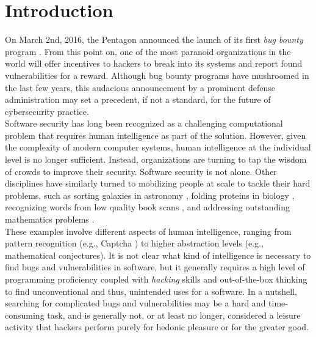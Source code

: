 \section{Introduction}
\label{sec:intro}
On March 2nd, 2016, the Pentagon announced the launch of its first {\it bug bounty} program \cite{Pentagon}. From this point on, one of the most paranoid organizations in the world will offer incentives to hackers to break into its systems and report found vulnerabilities for a reward. Although bug bounty programs have mushroomed in the last few years, this audacious announcement by a prominent defense administration may set a precedent, if not a standard, for the future of cybersecurity practice.\\ 

Software security has long been recognized as a challenging computational problem \cite{adams1984textordfeminineoptimizing} that requires human intelligence as part of the solution. However, given the complexity of modern computer systems, human intelligence at the individual level is no longer sufficient. Instead, organizations are turning to tap the wisdom of crowds \cite{surowiecki2005wisdom} to improve their security. Software security is not alone. Other disciplines have similarly turned to mobilizing people at scale to tackle their hard problems, such as sorting galaxies in astronomy \cite{smith2013introduction}, folding proteins in biology \cite{khatib2011algorithm}, recognizing words from low quality book scans \cite{von2003captcha}, and addressing outstanding mathematics problems \cite{gowers2009massively,cranshaw2011polymath}.\\

These examples involve different aspects of human intelligence, ranging from pattern recognition (e.g., Captcha \cite{von2003captcha}) to higher abstraction levels (e.g., mathematical conjectures). It is not clear what kind of intelligence is necessary to find bugs and vulnerabilities in software, but it generally requires a high level of programming proficiency coupled with {\it hacking} skills and out-of-the-box thinking to find unconventional and thus, unintended uses for a software. In a nutshell, searching for complicated bugs and vulnerabilities may be a hard and time-consuming task, and is generally not, or at least no longer, considered a leisure activity that hackers perform purely for hedonic pleasure or for the greater good.\\


